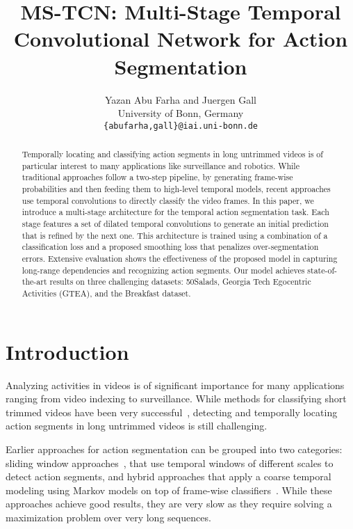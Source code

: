 \documentclass[10pt,twocolumn,letterpaper]{article}
\begin{document}
\title{MS-TCN: Multi-Stage Temporal Convolutional Network for Action Segmentation}

\author{Yazan Abu Farha and Juergen Gall\\
University of Bonn, Germany\\
{\tt\small \{abufarha,gall\}@iai.uni-bonn.de}
}

\maketitle


\begin{abstract}
   Temporally locating and classifying action segments in long untrimmed 
videos is of particular interest to many applications like surveillance 
and robotics. While traditional approaches follow a two-step pipeline, 
by generating frame-wise probabilities and then feeding them to high-level 
temporal models, recent approaches use temporal convolutions to directly 
classify the video frames. In this paper, we introduce a multi-stage 
architecture for the temporal action segmentation task. Each stage features 
a set of dilated temporal convolutions to generate an initial prediction that 
is refined by the next one. This architecture is trained using a combination 
of a classification loss and a proposed smoothing loss that penalizes 
over-segmentation errors. Extensive evaluation shows the effectiveness of the 
proposed model in capturing long-range dependencies and recognizing action 
segments. Our model achieves state-of-the-art results on three challenging 
datasets: 50Salads, Georgia Tech Egocentric Activities (GTEA), and the Breakfast dataset.
\end{abstract}

\section{Introduction}
Analyzing activities in videos is of significant importance for 
many applications ranging from video indexing to surveillance. 
While methods for classifying short trimmed videos have been very 
successful~\cite{carreira2017quo, feichtenhofer2016spatiotemporal}, 
detecting and temporally locating action segments in long untrimmed 
videos is still challenging.

Earlier approaches for action segmentation can be grouped into two categories: 
sliding window approaches~\cite{rohrbach2012database, karaman2014fast, 
oneata2014lear}, that use temporal windows of different scales to detect 
action segments, and hybrid approaches that apply a coarse temporal modeling using 
Markov models on top of frame-wise classifiers~\cite{kuehne2016end, lea2016segmental, 
richard2017weakly}. While these approaches achieve good results, they are very 
slow as they require solving a maximization problem over very long sequences.
\end{document}
